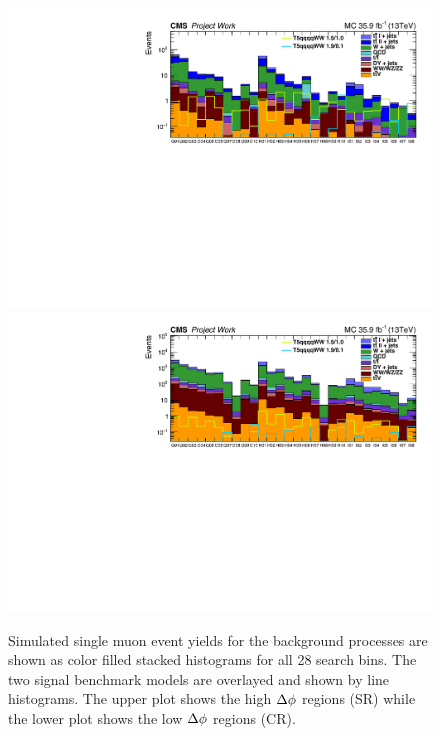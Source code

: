  \begin{figure}[!hbt]
    \begin{center}
 \includegraphics[width=0.95 \textwidth]{Plots/analysis/signalRegions/MC__mu__SR}\\
   \includegraphics[width=0.95 \textwidth]{Plots/analysis/signalRegions/MC__mu__CR}
  \caption{ \label{fig:MCcounts_mu} Simulated single muon event yields for the background processes are shown as color filled stacked histograms for all 28 search bins. The two signal benchmark models are overlayed and shown by line histograms. The upper plot shows the high $\Delta \phi$ regions (SR) while the lower plot shows the low $\Delta \phi$ regions (CR).
  }
   \end{center}
\end{figure}

